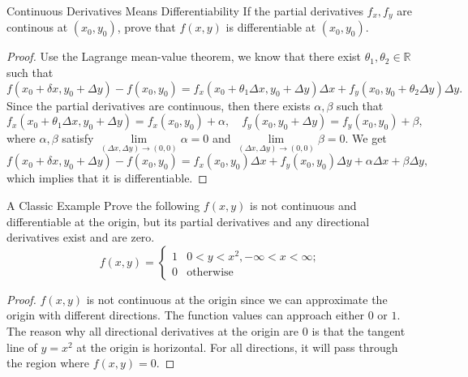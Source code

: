 \begin{proposition}{Continuous Derivatives Means Differentiability}{}
  If the partial derivatives $f_x, f_y$ are continous at $(x_0, y_0)$,
  prove that $f(x,y)$ is differentiable at $(x_0, y_0)$.
\end{proposition}

\begin{proof}
  Use the Lagrange mean-value theorem, we know that there exist $\theta_1,
  \theta_2 \in \mathbb{R}$ such that
  \begin{equation}
    f(x_0 + \delta x, y_0 + \Delta y) - f(x_0, y_0)
    = f_x(x_0 + \theta_1 \Delta x, y_0 + \Delta y) \Delta x
    + f_y(x_0, y_0 + \theta_2 \Delta y)\Delta y.
  \end{equation}
  Since the partial derivatives are continuous, then there exists $\alpha,
  \beta$ such that
  \begin{equation}
    f_x(x_0 + \theta_1 \Delta x, y_0 + \Delta y) = f_x(x_0, y_0) + \alpha,
    \quad f_y(x_0, y_0 + \Delta y) = f_y(x_0, y_0) + \beta,
  \end{equation}
  where $\alpha, \beta$ satisfy
  $\lim \limits _{(\Delta x, \Delta y) \rightarrow (0, 0)} \alpha = 0$ and
  $\lim \limits _{(\Delta x, \Delta y) \rightarrow (0, 0)} \beta = 0$.
  We get
  \begin{equation}
    f(x_0 + \delta x, y_0 + \Delta y) - f(x_0, y_0)
    = f_x(x_0, y_0) \Delta x + f_y(x_0, y_0)\Delta y + \alpha \Delta x + \beta \Delta y,
  \end{equation}
  which implies that it is differentiable.
\end{proof}

\begin{example}{A Classic Example}{}
  Prove the following $f(x, y)$ is not continuous and differentiable at the origin,
  but its partial derivatives and any directional derivatives exist and are zero.
  \begin{equation}
    f(x, y) =
    \begin{cases}
      1 & 0 < y < x^2, -\infty < x < \infty;\\
      0 & \text{otherwise}
    \end{cases}
  \end{equation}
\end{example}

\begin{proof}
  $f(x, y)$ is not continuous at the origin since we can approximate the origin
  with different directions.
  The function values can approach either $0$ or $1$.
  The reason why all directional derivatives at the origin are $0$ is that the
  tangent line of $y = x^2$ at the origin is horizontal.
  For all directions, it will pass through the region where $f(x, y) = 0$.
\end{proof}

